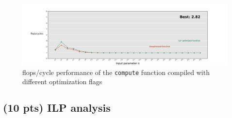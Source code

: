 \documentclass[tikz,14pt,fleqn]{article}
\begin{document}
\subsubsection{} %
\begin{figure}[h!]
    \vspace*{-0.7cm}
    \includegraphics[width=\linewidth]{../out/ex4.pdf}
    \caption{flops/cycle performance of the \texttt{compute} function compiled with different optimization flags}
\end{figure}
\subsubsection{} %
\subsubsection{} %

\subsubsection{} %

\subsubsection{} %


\subsection{(10 pts) ILP analysis}
\subsubsection{} %
\begin{figure}
    \centering
    \vspace*{-0.7cm}
    \begin{subfigure}{\linewidth}
        \inputminted[fontsize=\scriptsize, linenos, bgcolor=CODEBG]{C}{../ex5/artcomp.c}
    \end{subfigure}
\end{figure}
\end{document}
